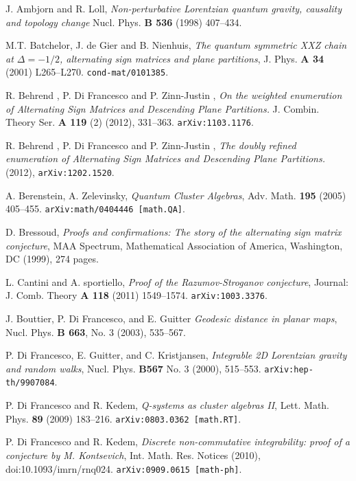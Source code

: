 \documentclass[12pt]{amsart}
\numberwithin{equation}{section}
\begin{document}
\begin{thebibliography}{10}

J. Ambjorn and R. Loll, {\em Non-perturbative Lorentzian quantum gravity, 
causality and topology change}
Nucl. Phys. {\bf B 536} (1998) 407--434.

M.T. Batchelor, J. de Gier and B. Nienhuis, 
{\em The quantum symmetric XXZ chain at $\Delta=-1/2$, alternating sign 
matrices and plane partitions}, J. Phys. {\bf A 34} (2001) L265--L270.
{\tt cond-mat/0101385}.

R. Behrend , P. Di Francesco  and P. Zinn-Justin , {\em On the weighted enumeration 
of Alternating Sign Matrices and Descending Plane Partitions.} 
J. Combin. Theory Ser. {\bf A 119} (2) (2012), 331--363. 
{\tt arXiv:1103.1176}.

R. Behrend , P. Di Francesco  and P. Zinn-Justin , {\em The doubly refined enumeration 
of Alternating Sign Matrices and Descending Plane Partitions.} (2012), 
{\tt arXiv:1202.1520}.

A. Berenstein, A. Zelevinsky, \emph{Quantum Cluster Algebras},
Adv. Math. {\bf 195} (2005) 405--455. 
{\tt arXiv:math/0404446 [math.QA]}.

 D. Bressoud, {\em Proofs and confirmations: 
The story of the alternating sign matrix conjecture},
MAA Spectrum,  Mathematical Association of America,
Washington, DC (1999), 274 pages.

L. Cantini and A. sportiello, {\em Proof of the Razumov-Stroganov conjecture},
 Journal: J. Comb. Theory {\bf A 118} (2011) 1549--1574.
 {\tt arXiv:1003.3376}.

 J. Bouttier, P. Di Francesco, and E. Guitter
{\em Geodesic distance in planar maps}, Nucl. Phys. {\bf B 663}, No. 3 (2003), 535--567.

  P. Di Francesco, E. Guitter, and C. Kristjansen, 
{\em  Integrable 2D Lorentzian gravity and random walks}, 
Nucl. Phys. {\bf B567} No. 3 (2000),  515--553.
{\tt arXiv:hep-th/9907084}.

 P. Di Francesco and R. Kedem, \emph{Q-systems as
cluster algebras II}, Lett. Math. Phys. {\bf 89} (2009) 183--216.
{\tt arXiv:0803.0362 [math.RT]}.

P. Di Francesco and R. Kedem, 
\emph{Discrete non-commutative integrability: proof of a 
conjecture by M. Kontsevich}, Int. Math. Res. Notices (2010),  doi:10.1093/imrn/rnq024.
{\tt arXiv:0909.0615 [math-ph]}.


\end{thebibliography}
\end{document}
